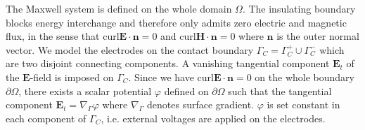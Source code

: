 \documentclass{article}
\begin{document}
The Maxwell system is defined on the whole domain $\Omega$. The insulating boundary blocks energy interchange and therefore only admits zero electric and magnetic flux, in the sense that $\text{curl}\mathbf{E}\cdot \mathbf{n} = 0$ and $\text{curl}\mathbf{H}\cdot \mathbf{n} = 0$ where $\mathbf{n}$ is the outer normal vector. We model the electrodes on the contact boundary $\Gamma_C = \Gamma_C^+\cup \Gamma_C^-$ which are two disjoint connecting components. A vanishing tangential component $\mathbf{E}_t$ of the $\mathbf{E}$-field is imposed on $\Gamma_C$. Since we have $\text{curl}\mathbf{E} \cdot \mathbf{n} = 0$ on the whole boundary $\partial\Omega$, there exists a scalar potential $\varphi$ defined on $\partial\Omega$ such that the tangential component $\mathbf{E}_t = \nabla_\Gamma \varphi$ where $\nabla_\Gamma$ denotes surface gradient. $\varphi$ is set constant in each component of $\Gamma_C$, i.e. external voltages are applied on the electrodes.
\end{document}
